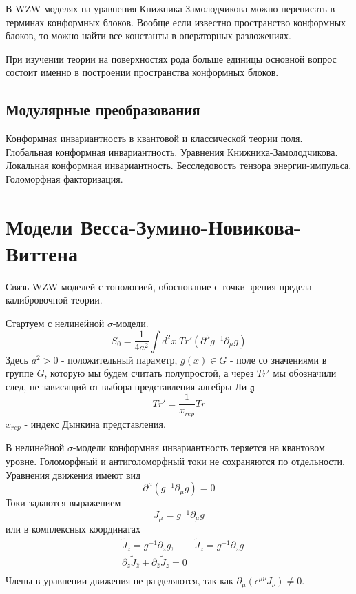 \documentclass[a4paper,12pt]{article}
\theoremstyle{definition} \newtheorem{Def}{Definition}
\begin{document}
В WZW-моделях на уравнения Книжника-Замолодчикова можно переписать в терминах конформных блоков. 
Вообще если известно пространство конформных блоков, то можно найти все константы в операторных разложениях.

При изучении теории на поверхностях рода больше единицы основной вопрос состоит именно в построении пространства конформных блоков. 

\subsection{Модулярные преобразования}
\label{sec:modular}


Конформная инвариантность в квантовой и классической теории поля.
Глобальная конформная инвариантность.
Уравнения Книжника-Замолодчикова.
Локальная конформная инвариантность. Бесследовость тензора энергии-импульса.
Голоморфная факторизация.

\section{Модели Весса-Зумино-Новикова-Виттена}
\label{sec:WZNW}

Связь WZW-моделей с топологией, обоснование с точки зрения предела калибровочной теории.

Стартуем с нелинейной $\sigma$-модели.
\begin{equation}
  \label{eq:48}
  S_0=\frac{1}{4a^2}\int d^2x\; Tr' (\partial^{\mu}g^{-1}\partial_{\mu}g)
\end{equation}
Здесь $a^2>0$ - положительный параметр, $g(x)\in G$ - поле со значениями в группе $G$, которую мы будем считать полупростой, а через $Tr'$ мы обозначили след, не зависящий от выбора представления алгебры Ли $\mathfrak{g} $
\begin{equation}
  \label{eq:70}
  Tr'=\frac{1}{x_{rep}}Tr
\end{equation}
$x_{rep}$ - индекс Дынкина представления.

В нелинейной $\sigma$-модели конформная инвариантность теряется на квантовом уровне.
Голоморфный и антиголоморфный токи не сохраняются по отдельности. Уравнения движения имеют вид
\begin{equation}
  \label{eq:71}
  \partial^{\mu}(g^{-1}\partial_{\mu}g)=0
\end{equation}
Токи задаются выражением
\begin{equation}
  \label{eq:currents}
  J_{\mu}=g^{-1}\partial_{\mu}g
\end{equation}
или в комплексных координатах
\begin{equation}
  \label{eq:74}
  \begin{matrix}
    & \tilde{J}_z=g^{-1}\partial_z g, & \tilde{J}_{\bar{z}}=g^{-1}\partial_{\bar{z}}g\\
    & \partial_z \tilde{J}_{\bar{z}}+\partial_{\bar{z}}\tilde{J}_z=0 & \\
  \end{matrix}
\end{equation}
Члены в уравнении движения не разделяются, так как $\partial_{\mu}(\epsilon^{\mu\nu}J_{\nu})\neq 0$.
\end{document}
